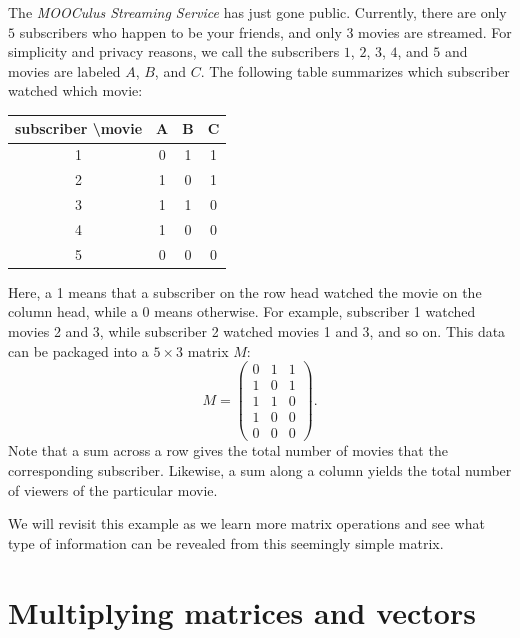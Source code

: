 \documentclass{ximera}
\begin{document}
\begin{example}
  The \textit{MOOCulus Streaming Service} has just gone
  public. Currently, there are only $5$ subscribers who happen to be
  your friends, and only $3$ movies are streamed. For simplicity and
  privacy reasons, we call the subscribers $1$, $2$, $3$, $4$, and $5$ and
  movies are labeled $A$, $B$, and $C$. The following table summarizes
  which subscriber watched which movie:
  \begin{center}
    \begin{tabular}{c|ccc}
      subscriber \textbackslash movie & A & B & C \\ \hline
      1 & 0 & 1 & 1\\
      2 & 1 & 0 & 1\\
      3 & 1 & 1 & 0\\
      4 & 1 & 0 & 0\\
      5 & 0 & 0 & 0
    \end{tabular}
  \end{center}
  Here, a 1 means that a subscriber on the row head watched the movie on
  the column head, while a 0 means otherwise. For example, subscriber
  1 watched movies 2 and 3, while subscriber 2 watched movies 1 and 3,
  and so on. This data can be packaged into a $5 \times 3$ matrix $M$:
  \[
    M =
    \begin{pmatrix}
      0 & 1 & 1\\
      1 & 0 & 1\\
      1 & 1 & 0\\
      1 & 0 & 0\\
      0 & 0 & 0
    \end{pmatrix}.
  \]
  Note that a sum across a row gives the total number of movies that
  the corresponding subscriber. Likewise, a sum along a column yields
  the total number of viewers of the particular movie.

  We will revisit this example as we learn more matrix operations and
  see what type of information can be revealed from this seemingly
  simple matrix.
\end{example}





\section{Multiplying matrices and vectors}
\end{document}
